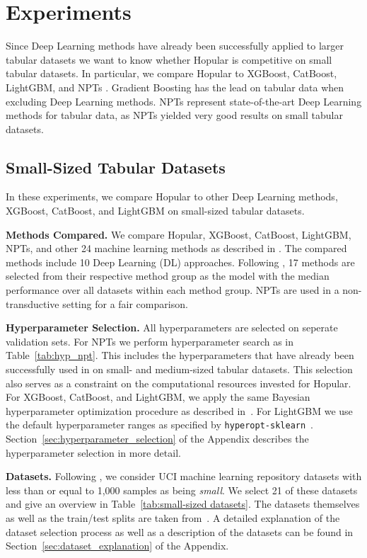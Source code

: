 \documentclass{article}
\theoremstyle{plain}
\theoremstyle{definition}
\theoremstyle{remark}
\begin{document}
\section{Experiments}
\label{sec:experiments}

Since Deep Learning methods have already been successfully applied to larger tabular datasets \citep{Avati:18,Simm:18,Zhang:19,Mayr:18}
we want to know whether Hopular 
is competitive on small tabular datasets. 
In particular, we compare Hopular to XGBoost, CatBoost, LightGBM, and NPTs \citep{Kossen:21}.
Gradient Boosting has the lead on tabular data when excluding Deep Learning methods.
NPTs represent state-of-the-art Deep Learning methods
for tabular data,
as NPTs yielded very good results on small tabular datasets.

\subsection{Small-Sized Tabular Datasets}
\label{sec:experiments_uci}

In these experiments, we compare Hopular to other Deep Learning methods, XGBoost, CatBoost, and LightGBM on small-sized tabular datasets.

{\bf Methods Compared.}
We compare Hopular, XGBoost, CatBoost, LightGBM, NPTs, and other 24 machine learning
methods as described in \citep{Klambauer:17}.
The compared methods include 10 Deep Learning (DL) approaches.
Following \citep{Klambauer:17,Wainberg:16},
17 methods are selected from their respective method group 
as the model with the median performance over all datasets within each method group.
NPTs are used in a non-transductive setting for a fair comparison. 

{\bf Hyperparameter Selection.} 
All hyperparameters are selected on seperate validation sets. For NPTs we perform hyperparameter search as in Table~\ref{tab:hyp_npt}. This includes the hyperparameters that have already been successfully used in \citep{Kossen:21} on small- and medium-sized tabular datasets. 
This selection also serves as a constraint on the computational resources invested for Hopular.
For XGBoost, CatBoost, and LightGBM, we apply the same Bayesian hyperparameter optimization 
procedure as described in~\citep{ShwartzZiv:21}. For LightGBM we use the default hyperparameter ranges as specified by \texttt{hyperopt-sklearn}~\citep{Komer:14}.
Section~\ref{sec:hyperparameter_selection} of the Appendix describes the hyperparameter selection in more detail.

{\bf Datasets.} 
Following \citep{Klambauer:17}, 
we consider UCI machine learning repository datasets 
with less than or equal to 1,000 samples as being {\em small}.
We select 21 of these datasets and give an overview in Table~\ref{tab:small-sized datasets}.
The datasets themselves as well as the train/test splits are taken from~\citep{Fernandez:14}.
A detailed explanation of the dataset selection process as well as a description of the datasets can be found in Section~\ref{sec:dataset_explanation} of the Appendix.
\end{document}
